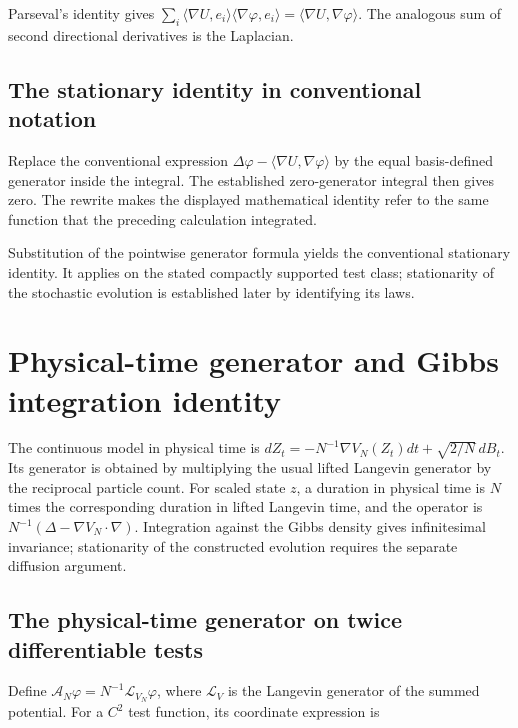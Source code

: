 \documentclass[11pt,a4paper]{article}
\begin{document}
Parseval's identity gives \(\sum_i\langle\nabla U,e_i\rangle\langle\nabla\varphi,e_i\rangle=\langle\nabla U,\nabla\varphi\rangle\). The analogous sum of second directional derivatives is the Laplacian.


\subsection{\texorpdfstring{The stationary identity in conventional notation}{The stationary identity in conventional notation}}


Replace the conventional expression \(\Delta\varphi-\langle\nabla U,\nabla\varphi\rangle\) by the equal basis-defined generator inside the integral. The established zero-generator integral then gives zero. The rewrite makes the displayed mathematical identity refer to the same function that the preceding calculation integrated.



Substitution of the pointwise generator formula yields the conventional stationary identity. It applies on the stated compactly supported test class; stationarity of the stochastic evolution is established later by identifying its laws.


\section{\texorpdfstring{Physical-time generator and Gibbs integration identity}{Physical-time generator and Gibbs integration identity}}


The continuous model in physical time is \(dZ_t=-N^{-1}\nabla V_N(Z_t)dt+\sqrt{2/N}\,dB_t\). Its generator is obtained by multiplying the usual lifted Langevin generator by the reciprocal particle count. For scaled state \(z\), a duration in physical time is \(N\) times the corresponding duration in lifted Langevin time, and the operator is \(N^{-1}(\Delta-\nabla V_N\cdot\nabla)\). Integration against the Gibbs density gives infinitesimal invariance; stationarity of the constructed evolution requires the separate diffusion argument.


\subsection{\texorpdfstring{The physical-time generator on twice differentiable tests}{The physical-time generator on twice differentiable tests}}


Define \(\mathcal A_N\varphi=N^{-1}\mathcal L_{V_N}\varphi\), where \(\mathcal L_V\) is the Langevin generator of the summed potential. For a \(C^2\) test function, its coordinate expression is
\end{document}
